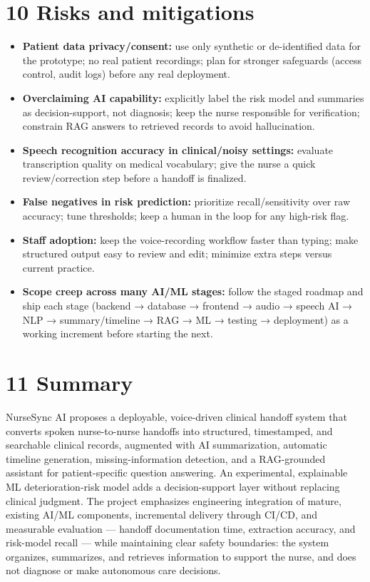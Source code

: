 \documentclass[
]{article}
\begin{document}
\section{}\label{section-2}

\section{10 Risks and mitigations}\label{risks-and-mitigations}

\begin{itemize}
\item
  \textbf{Patient data privacy/consent:} use only synthetic or
  de-identified data for the prototype; no real patient recordings; plan
  for stronger safeguards (access control, audit logs) before any real
  deployment.
\item
  \textbf{Overclaiming AI capability:} explicitly label the risk model
  and summaries as decision-support, not diagnosis; keep the nurse
  responsible for verification; constrain RAG answers to retrieved
  records to avoid hallucination.
\item
  \textbf{Speech recognition accuracy in clinical/noisy settings:}
  evaluate transcription quality on medical vocabulary; give the nurse a
  quick review/correction step before a handoff is finalized.
\item
  \textbf{False negatives in risk prediction:} prioritize
  recall/sensitivity over raw accuracy; tune thresholds; keep a human in
  the loop for any high-risk flag.
\item
  \textbf{Staff adoption:} keep the voice-recording workflow faster than
  typing; make structured output easy to review and edit; minimize extra
  steps versus current practice.
\item
  \textbf{Scope creep across many AI/ML stages:} follow the staged
  roadmap and ship each stage (backend → database → frontend → audio →
  speech AI → NLP → summary/timeline → RAG → ML → testing → deployment)
  as a working increment before starting the next.
\end{itemize}

\section{11 Summary}\label{summary}

NurseSync AI proposes a deployable, voice-driven clinical handoff system
that converts spoken nurse-to-nurse handoffs into structured,
timestamped, and searchable clinical records, augmented with AI
summarization, automatic timeline generation, missing-information
detection, and a RAG-grounded assistant for patient-specific question
answering. An experimental, explainable ML deterioration-risk model adds
a decision-support layer without replacing clinical judgment. The
project emphasizes engineering integration of mature, existing AI/ML
components, incremental delivery through CI/CD, and measurable
evaluation --- handoff documentation time, extraction accuracy, and
risk-model recall --- while maintaining clear safety boundaries: the
system organizes, summarizes, and retrieves information to support the
nurse, and does not diagnose or make autonomous care decisions.
\end{document}
